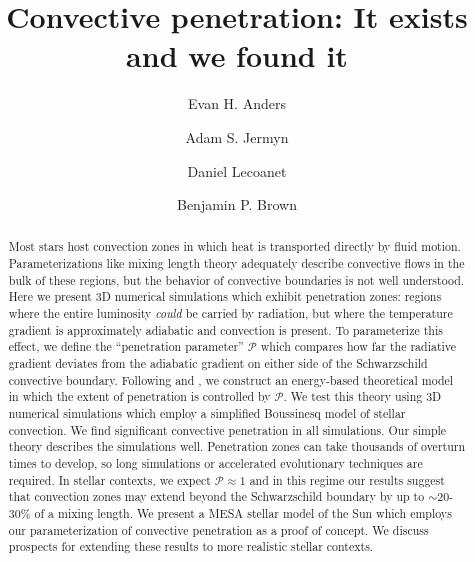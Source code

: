 \documentclass[twocolumn]{aastex631}
\newcommand{\mP}{\ensuremath{\mathcal{P}}}
\begin{document}
\title{Convective penetration: It exists and we found it}
\author[0000-0002-3433-4733]{Evan H. Anders}
\author[0000-0001-5048-9973]{Adam S. Jermyn}
\author[0000-0002-7635-9728]{Daniel Lecoanet}
\author[0000-0001-8935-219X]{Benjamin P. Brown}


\begin{abstract}
Most stars host convection zones in which heat is transported directly by fluid motion.
Parameterizations like mixing length theory adequately describe convective flows in the bulk of these regions, but the behavior of convective boundaries is not well understood.
Here we present 3D numerical simulations which exhibit penetration zones: regions where the entire luminosity \emph{could} be carried by radiation, but where the temperature gradient is approximately adiabatic and convection is present.
To parameterize this effect, we define the ``penetration parameter'' $\mP$ which compares how far the radiative gradient deviates from the adiabatic gradient on either side of the Schwarzschild convective boundary.
Following \citet{roxburgh1989} and \citet{zahn1991}, we construct an energy-based theoretical model in which the extent of penetration is controlled by $\mP$.
We test this theory using 3D numerical simulations which employ a simplified Boussinesq model of stellar convection.
We find significant convective penetration in all simulations.
Our simple theory describes the simulations well.
Penetration zones can take thousands of overturn times to develop, so long simulations or accelerated evolutionary techniques are required.
In stellar contexts, we expect $\mathcal{P} \approx 1$ and in this regime our results suggest that convection zones may extend beyond the Schwarzschild boundary by up to $\sim$20-30\% of a mixing length.
We present a MESA stellar model of the Sun which employs our parameterization of convective penetration as a proof of concept.
We discuss prospects for extending these results to more realistic stellar contexts.
\end{abstract}
\end{document}

